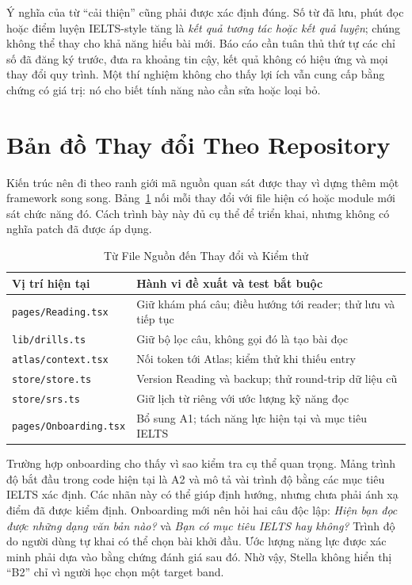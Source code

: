 \documentclass[conference,10pt]{IEEEtran}
\begin{document}
Ý nghĩa của từ ``cải thiện'' cũng phải được xác định đúng. Số từ đã lưu, phút đọc hoặc điểm luyện IELTS-style tăng là \emph{kết quả tương tác hoặc kết quả luyện}; chúng không thể thay cho khả năng hiểu bài mới. Báo cáo cần tuân thủ thứ tự các chỉ số đã đăng ký trước, đưa ra khoảng tin cậy, kết quả không có hiệu ứng và mọi thay đổi quy trình. Một thí nghiệm không cho thấy lợi ích vẫn cung cấp bằng chứng có giá trị: nó cho biết tính năng nào cần sửa hoặc loại bỏ.


\section{Bản đồ Thay đổi Theo Repository}
Kiến trúc nên đi theo ranh giới mã nguồn quan sát được thay vì dựng thêm một framework song song. Bảng~\ref{tab:files} nối mỗi thay đổi với file hiện có hoặc module mới sát chức năng đó. Cách trình bày này đủ cụ thể để triển khai, nhưng không có nghĩa patch đã được áp dụng.

\begin{table}[t]
\caption{Từ File Nguồn đến Thay đổi và Kiểm thử}
\label{tab:files}
\centering\footnotesize
\begin{tabularx}{\columnwidth}{@{}p{}X@{}}
\toprule
Vị trí hiện tại & Hành vi đề xuất và test bắt buộc\\
\midrule
\texttt{pages/Reading.tsx} & Giữ khám phá câu; điều hướng tới reader; thử lưu và tiếp tục\\
\texttt{lib/drills.ts} & Giữ bộ lọc câu, không gọi đó là tạo bài đọc\\
\texttt{atlas/context.tsx} & Nối token tới Atlas; kiểm thử khi thiếu entry\\
\texttt{store/store.ts} & Version Reading và backup; thử round-trip dữ liệu cũ\\
\texttt{store/srs.ts} & Giữ lịch từ riêng với ước lượng kỹ năng đọc\\
\texttt{pages/Onboarding.tsx} & Bổ sung A1; tách năng lực hiện tại và mục tiêu IELTS\\
\bottomrule
\end{tabularx}
\end{table}

Trường hợp onboarding cho thấy vì sao kiểm tra cụ thể quan trọng. Mảng trình độ bắt đầu trong code hiện tại là A2 và mô tả vài trình độ bằng các mục tiêu IELTS xác định. Các nhãn này có thể giúp định hướng, nhưng chưa phải ánh xạ điểm đã được kiểm định. Onboarding mới nên hỏi hai câu độc lập: \emph{Hiện bạn đọc được những dạng văn bản nào?} và \emph{Bạn có mục tiêu IELTS hay không?} Trình độ do người dùng tự khai có thể chọn bài khởi đầu. Ước lượng năng lực được xác minh phải dựa vào bằng chứng đánh giá sau đó. Nhờ vậy, Stella không hiển thị ``B2'' chỉ vì người học chọn một target band.
\end{document}
